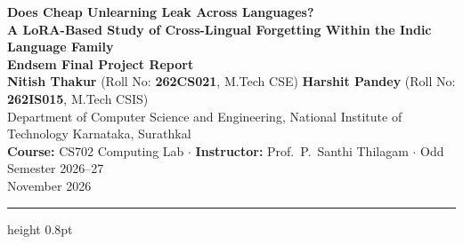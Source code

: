 \documentclass[11pt,a4paper]{article}
\begin{document}
\begin{center}
    {\Large \bfseries Does Cheap Unlearning Leak Across Languages?\\[0.25em]
    A LoRA-Based Study of Cross-Lingual Forgetting Within the Indic Language Family}\\[0.6em]
    {\large \textbf{Endsem Final Project Report}}\\[0.8em]
    
    \textbf{Nitish Thakur} (Roll No: \textbf{262CS021}, M.Tech CSE) \qquad
    \textbf{Harshit Pandey} (Roll No: \textbf{262IS015}, M.Tech CSIS)\\[0.4em]
    
    {\small Department of Computer Science and Engineering, National Institute of Technology Karnataka, Surathkal}\\[0.2em]
    {\small \textbf{Course:} CS702 Computing Lab \quad $\cdot$ \quad \textbf{Instructor:} Prof.\ P.\ Santhi Thilagam \quad $\cdot$ \quad Odd Semester 2026--27}\\[0.2em]
    {\small November 2026}
\end{center}
\vspace{-0.5em}
\hrule height 0.8pt
\vspace{0.8em}
\end{document}
